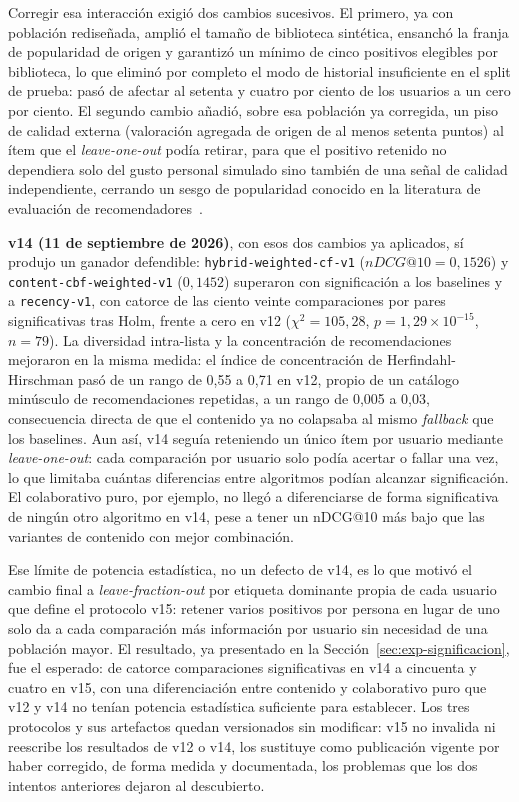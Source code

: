 Corregir esa interacción exigió dos cambios sucesivos. El primero, ya con población
rediseñada, amplió el tamaño de biblioteca sintética, ensanchó la franja de popularidad de
origen y garantizó un mínimo de cinco positivos elegibles por biblioteca, lo que eliminó por
completo el modo de historial insuficiente en el split de prueba: pasó de afectar al setenta y
cuatro por ciento de los usuarios a un cero por ciento. El segundo cambio añadió, sobre esa
población ya corregida, un piso de calidad externa (valoración agregada de origen de al menos
setenta puntos) al ítem que el \emph{leave-one-out} podía retirar, para que el positivo
retenido no dependiera solo del gusto personal simulado sino también de una señal de calidad
independiente, cerrando un sesgo de popularidad conocido en la literatura de evaluación de
recomendadores~\cite{cremonesi2010performance}.

\textbf{v14 (11 de septiembre de 2026)}, con esos dos cambios ya aplicados, sí produjo un
ganador defendible: \texttt{hybrid-weighted-cf-v1} (\(nDCG@10=0{,}1526\)) y
\texttt{content-cbf-weighted-v1} (\(0{,}1452\)) superaron con significación a los baselines y
a \texttt{recency-v1}, con catorce de las ciento veinte comparaciones por pares significativas
tras Holm, frente a cero en v12 (\(\chi^2=105{,}28\), \(p=1{,}29\times10^{-15}\), \(n=79\)). La
diversidad intra-lista y la concentración de recomendaciones mejoraron en la misma medida: el
índice de concentración de Herfindahl-Hirschman pasó de un rango de 0,55 a 0,71 en v12, propio
de un catálogo minúsculo de recomendaciones repetidas, a un rango de 0,005 a 0,03, consecuencia
directa de que el contenido ya no colapsaba al mismo \emph{fallback} que los baselines. Aun
así, v14 seguía reteniendo un único ítem por usuario mediante \emph{leave-one-out}: cada
comparación por usuario solo podía acertar o fallar una vez, lo que limitaba cuántas
diferencias entre algoritmos podían alcanzar significación. El colaborativo puro, por ejemplo,
no llegó a diferenciarse de forma significativa de ningún otro algoritmo en v14, pese a tener
un nDCG@10 más bajo que las variantes de contenido con mejor combinación.

Ese límite de potencia estadística, no un defecto de v14, es lo que motivó el cambio final a
\emph{leave-fraction-out} por etiqueta dominante propia de cada usuario que define el
protocolo v15: retener varios positivos por persona en lugar de uno solo da a cada comparación
más información por usuario sin necesidad de una población mayor. El resultado, ya presentado
en la Sección~\ref{sec:exp-significacion}, fue el esperado: de catorce comparaciones
significativas en v14 a cincuenta y cuatro en v15, con una diferenciación entre contenido y
colaborativo puro que v12 y v14 no tenían potencia estadística suficiente para establecer.
Los tres protocolos y sus artefactos quedan versionados sin modificar: v15 no invalida ni
reescribe los resultados de v12 o v14, los sustituye como publicación vigente por haber
corregido, de forma medida y documentada, los problemas que los dos intentos anteriores dejaron
al descubierto.

